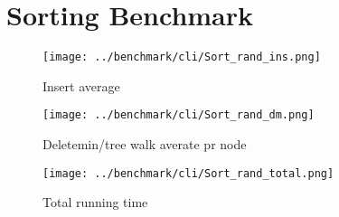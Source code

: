 \section*{Sorting Benchmark}

\begin{figure}[htb]
\centering
\texttt{[image: ../benchmark/cli/Sort\_rand\_ins.png]}
\caption{Insert average}
\label{fig:randsort-ins}
\end{figure}

\begin{figure}[htb]
\centering
\texttt{[image: ../benchmark/cli/Sort\_rand\_dm.png]}
\caption{Deletemin/tree walk averate pr node}
\label{fig:randsort-dm}
\end{figure}

\begin{figure}[htb]
\centering
\texttt{[image: ../benchmark/cli/Sort\_rand\_total.png]}
\caption{Total running time}
\label{fig:randsort-tot}
\end{figure}